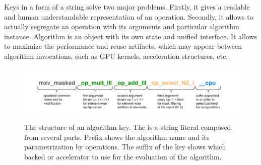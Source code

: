 Keys in a form of a string solve two major problems. Firstly, it gives a readable and human understandable representation of an operation. Secondly, it allows to actually segregate an operation with its arguments and particular algorithm instance. Algorithm is an object with its own state and unified interface. It allows to maximize the performance and reuse artifacts, which may appear between algorithm invocations, such as GPU kernels, acceleration structures, etc. 

\begin{figure}[]
    \centering
    \includegraphics[width=1.0\textwidth]{images/spla_algo_key.png}
    \caption{The structure of an algorithm key. The is a string literal composed from several parts. Prefix shows the algorithm name and its parametrization by operations. The suffix of the key shows which backed or accelerator to use for the evaluation of the algorithm.}
    \label{fig:algo_key}
\end{figure}